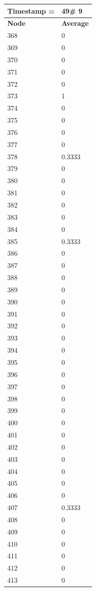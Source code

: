\begin{tabular}{|l||l|}
\hline
\textbf{Timestamp =} & \textbf{49}\# 9\\\hline
	\textbf{Node} & \textbf{Average} \\ \hline
\hline
	368 & 0 \\ \hline
	369 & 0 \\ \hline
	370 & 0 \\ \hline
	371 & 0 \\ \hline
	372 & 0 \\ \hline
	373 & 1 \\ \hline
	374 & 0 \\ \hline
	375 & 0 \\ \hline
	376 & 0 \\ \hline
	377 & 0 \\ \hline
	378 & 0.3333 \\ \hline
	379 & 0 \\ \hline
	380 & 0 \\ \hline
	381 & 0 \\ \hline
	382 & 0 \\ \hline
	383 & 0 \\ \hline
	384 & 0 \\ \hline
	385 & 0.3333 \\ \hline
	386 & 0 \\ \hline
	387 & 0 \\ \hline
	388 & 0 \\ \hline
	389 & 0 \\ \hline
	390 & 0 \\ \hline
	391 & 0 \\ \hline
	392 & 0 \\ \hline
	393 & 0 \\ \hline
	394 & 0 \\ \hline
	395 & 0 \\ \hline
	396 & 0 \\ \hline
	397 & 0 \\ \hline
	398 & 0 \\ \hline
	399 & 0 \\ \hline
	400 & 0 \\ \hline
	401 & 0 \\ \hline
	402 & 0 \\ \hline
	403 & 0 \\ \hline
	404 & 0 \\ \hline
	405 & 0 \\ \hline
	406 & 0 \\ \hline
	407 & 0.3333 \\ \hline
	408 & 0 \\ \hline
	409 & 0 \\ \hline
	410 & 0 \\ \hline
	411 & 0 \\ \hline
	412 & 0 \\ \hline
	413 & 0 \\ \hline
\end{tabular}

